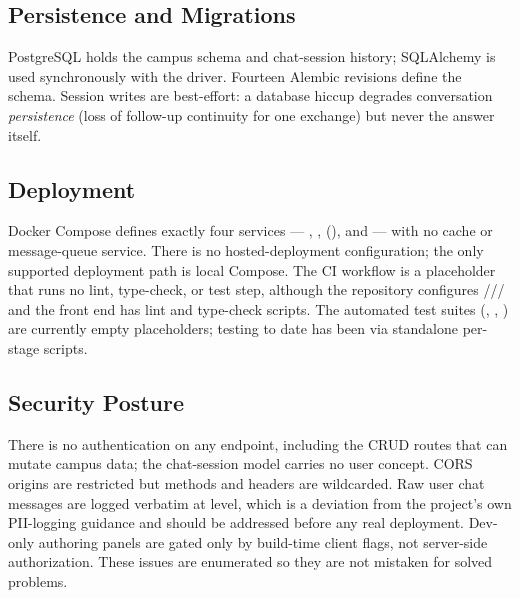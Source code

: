 \subsection{Persistence and Migrations}
PostgreSQL holds the campus schema and chat-session history; SQLAlchemy is
used synchronously with the  driver. Fourteen Alembic
revisions define the schema. Session writes are best-effort: a database
hiccup degrades conversation \emph{persistence} (loss of follow-up
continuity for one exchange) but never the answer itself.

\subsection{Deployment}
Docker Compose defines exactly four services --- ,
,  (), and 
--- with no cache or message-queue service. There is no hosted-deployment
configuration; the only supported deployment path is local Compose. The CI
workflow is a placeholder that runs no lint, type-check, or test step,
although the repository configures ///
 and the front end has lint and type-check scripts. The
automated test suites (, ,
) are currently empty placeholders; testing to date has
been via standalone per-stage scripts.

\subsection{Security Posture}
There is no authentication on any endpoint, including the CRUD routes that
can mutate campus data; the chat-session model carries no user concept.
CORS origins are restricted but methods and headers are wildcarded. Raw
user chat messages are logged verbatim at  level, which is a
deviation from the project's own PII-logging guidance and should be
addressed before any real deployment. Dev-only authoring panels are gated
only by build-time client flags, not server-side authorization. These
issues are enumerated so they are not mistaken for solved problems.
